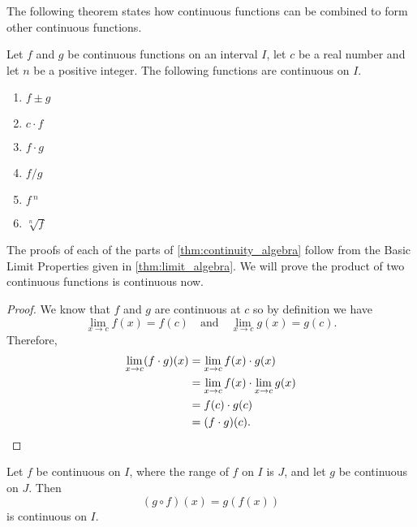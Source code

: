 The following theorem states how continuous functions can be combined to form other continuous functions.

\begin{theorem}\label{thm:continuity_algebra}%
Let $f$ and $g$ be continuous functions on an interval $I$, let $c$ be a real number and let $n$ be a positive integer. The following functions are continuous on $I$.
\begin{enumerate}
	\item	{} $f\pm g$
	\item	{} $c\cdot f$
	\item	{} $f\cdot g$
	\item	{}	$f/g$ 
	\item	{} $f\,^n$
	\item	{}	$\sqrt[n]{f}$ 
\end{enumerate}
\end{theorem}

The proofs of each of the parts of \autoref{thm:continuity_algebra} follow from the Basic Limit Properties given in \autoref{thm:limit_algebra}. We will prove the product of two continuous functions is continuous now.

\begin{proof}
We know that $f$ and $g$ are continuous at $c$ so by definition we have
\[\lim_{x\to c}f(x)=f(c) \quad \text{and} \quad \lim_{x\to c} g(x)=g(c).\]
Therefore,\vspace{-.3\baselineskip}
\begin{align*}
\lim_{x\to c} (f\cdot g)(x)&=\lim_{x\to c} f(x)\cdot g(x)\\
&=\lim_{x\to c}f(x) \cdot \lim_{x\to c} g(x)\\
&=f(c)\cdot g(c)\\
&=(f\cdot g)(c).\qedhere
\end{align*}
\end{proof}

\begin{theorem}\label{thm:composition_continuous}%
Let $f$ be continuous on $I$, where the range of $f$ on $I$ is $J$, and let $g$ be continuous on $J$. Then\vspace{-.3\baselineskip}
\[(g\circ f)(x)=g(f(x))\]
is continuous on $I$.
\end{theorem}

